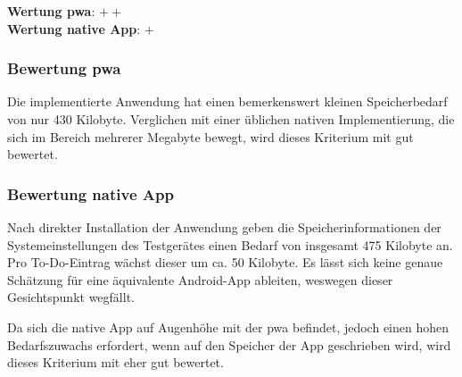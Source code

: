 \textbf{Wertung \ac{pwa}}: $++$ \\
\textbf{Wertung native App}: $+$ \\

\subsubsection{Bewertung \ac{pwa}}
Die implementierte Anwendung hat einen bemerkenswert kleinen Speicherbedarf von  nur 430 Kilobyte. Verglichen mit einer üblichen nativen Implementierung, die sich im Bereich mehrerer Megabyte bewegt, wird dieses Kriterium mit gut bewertet.

\subsubsection{Bewertung native App}
Nach direkter Installation der Anwendung geben die Speicherinformationen der Systemeinstellungen des Testgerätes einen Bedarf von insgesamt 475 Kilobyte an. Pro To-Do-Eintrag wächst dieser um ca. 50 Kilobyte. Es lässt sich keine genaue Schätzung für eine äquivalente Android-App ableiten, weswegen dieser Gesichtspunkt wegfällt.

Da sich die native App auf Augenhöhe mit der \ac{pwa} befindet, jedoch einen hohen Bedarfszuwachs erfordert, wenn auf den Speicher der App geschrieben wird, wird dieses Kriterium mit eher gut bewertet.